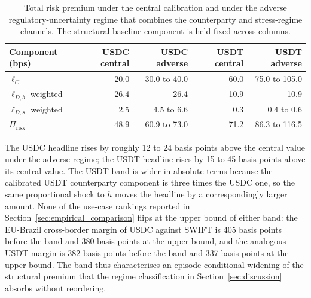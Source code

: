 \begin{table}[H]
\centering
\caption{Total risk premium under the central calibration and under the adverse regulatory-uncertainty regime that combines the counterparty and stress-regime channels. The structural baseline component is held fixed across columns.}\label{tab:reg_uncertainty_band}
\begin{tabular}{lrrrr}
\toprule
Component (bps)             & USDC central & USDC adverse & USDT central & USDT adverse \\
\midrule
$\ell_C$                    & 20.0  & 30.0 to 40.0  & 60.0  & 75.0 to 105.0 \\
$\ell_{D,b}$ weighted       & 26.4  & 26.4          & 10.9  & 10.9 \\
$\ell_{D,s}$ weighted       & 2.5   & 4.5 to 6.6    & 0.3   & 0.4 to 0.6 \\
\midrule
$\Pi_{\text{risk}}$         & 48.9  & 60.9 to 73.0  & 71.2  & 86.3 to 116.5 \\
\bottomrule
\end{tabular}
\end{table}

The USDC headline rises by roughly 12 to 24 basis points above the central value under the adverse regime; the USDT headline rises by 15 to 45 basis points above its central value. The USDT band is wider in absolute terms because the calibrated USDT counterparty component is three times the USDC one, so the same proportional shock to $h$ moves the headline by a correspondingly larger amount. None of the use-case rankings reported in Section~\ref{sec:empirical_comparison} flips at the upper bound of either band: the EU-Brazil cross-border margin of USDC against SWIFT is 405 basis points before the band and 380 basis points at the upper bound, and the analogous USDT margin is 382 basis points before the band and 337 basis points at the upper bound. The band thus characterises an episode-conditional widening of the structural premium that the regime classification in Section~\ref{sec:discussion} absorbs without reordering.
